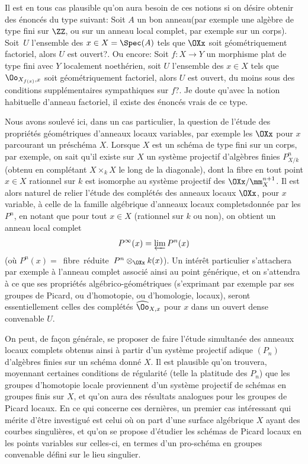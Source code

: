 Il est en tous cas plausible qu'on aura besoin de ces notions si on d\'esire obtenir des \'enonc\'es du type suivant: Soit $A$ un \og bon anneau\fg (par exemple une alg\`ebre de type fini sur $\ZZ$, ou sur un anneau local complet, par exemple sur un corps). Soit~$U$ l'ensemble des $x\in X=\Spec(A)$ tels que $\OXx$ soit \og g\'eom\'etriquement factoriel\fg, alors $U$ est ouvert?. Ou encore: Soit $f\colon X\to Y$ un morphisme plat de type fini avec $Y$ localement noeth\'erien, soit $U$ l'ensemble des $x\in X$ tels que $\Oo_{X_{f(x)}, x}$ soit \og g\'eom\'etriquement factoriel\fg, alors $U$ est ouvert, du moins sous des conditions suppl\'ementaires sympathiques sur $f$?. Je doute qu'avec la notion habituelle d'anneau factoriel, il existe des \'enonc\'es vrais de ce type.

Nous avons soulev\'e ici, dans un cas particulier, la question de l'\'etude des propri\'et\'es g\'eom\'etriques d'anneaux locaux \og variables\fg, par exemple les $\OXx$ pour $x$ parcourant un pr\'esch\'ema $X$. Lorsque $X$ est un sch\'ema de type fini sur un corps, par exemple, on sait qu'il existe sur $X$ un syst\`eme projectif d'alg\`ebres finies $P^n_{X/k}$ (obtenu en compl\'etant $X\times_k X$ le long de la diagonale), dont la fibre en tout point $x\in X$ rationnel sur $k$ est isomorphe au syst\`eme projectif des $\OXx/\mm_X^{n+1}$. Il est alors naturel de relier l'\'etude des compl\'et\'es des anneaux locaux $\OXx$, pour $x$ variable, \`a celle de la \og famille alg\'ebrique d'anneaux locaux complets\fg donn\'ee par les $P^n$, en notant que pour tout $x\in X$ (rationnel sur $k$ ou non), on obtient un anneau local complet
$$
P^{\infty}(x)=\varprojlim P^n(x)
$$
(o\`u $P^n(x)=$~fibre~r\'eduite~$P^n\otimes_{\OXx}k(x)$). Un int\'er\^et particulier s'attachera par exemple \`a l'anneau complet associ\'e ainsi au point g\'en\'erique, et on s'attendra \`a ce que ses propri\'et\'es alg\'ebrico-g\'eom\'etriques (s'exprimant par exemple par ses groupes de Picard, ou d'homotopie, ou d'homologie, locaux), seront essentiellement celles des compl\'et\'es $\widehat{\Oo}_{X, x}$ pour $x$ dans un ouvert dense convenable $U$.

On peut, de fa\c con g\'en\'erale, se proposer de faire l'\'etude simultan\'ee des anneaux locaux complets obtenus ainsi \`a partir d'un syst\`eme projectif adique $(P_n)$ d'alg\`ebres finies sur un sch\'ema donn\'e $X$. Il est plausible qu'on trouvera, moyennant certaines conditions de r\'egularit\'e (telle la platitude des $P_n$) que les groupes d'homotopie locale proviennent d'un syst\`eme projectif de sch\'emas en groupes finis sur $X$, et qu'on aura des r\'esultats analogues pour les groupes de Picard locaux. En ce qui concerne ces derni\`eres, un premier cas int\'eressant qui m\'erite d'\^etre investigu\'e est celui o\`u on part d'une surface alg\'ebrique $X$ ayant des courbes singuli\`eres, et qu'on se propose d'\'etudier les sch\'emas de Picard locaux en les points variables sur celles-ci, en termes d'un pro-sch\'ema en groupes convenable d\'efini sur le lieu singulier.

